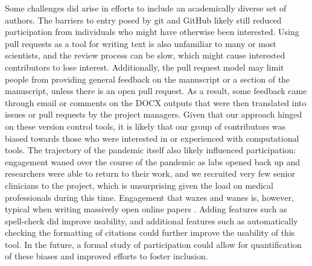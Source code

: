 \documentclass[twocolumn]{ceurart}
\begin{document}
Some challenges did arise in efforts to include an academically diverse set of authors.
The barriers to entry posed by git and GitHub likely still reduced participation from individuals who might have otherwise been interested.
Using pull requests as a tool for writing text is also unfamiliar to many or most scientists, and the review process can be slow, which might cause interested contributors to lose interest.
Additionally, the pull request model may limit people from providing general feedback on the manuscript or a section of the manuscript, unless there is an open pull request.
As a result, some feedback came through email or comments on the DOCX outputs that were then translated into issues or pull requests by the project managers.
Given that our approach hinged on these version control tools, it is likely that our group of contributors was biased towards those who were interested in or experienced with computational tools.
The trajectory of the pandemic itself also likely influenced participation: engagement waned over the course of the pandemic as labs opened back up and researchers were able to return to their work, and we recruited very few senior clinicians to the project, which is unsurprising given the load on medical professionals during this time.
Engagement that waxes and wanes is, however, typical when writing massively open online papers \citep{PoDz2q0A}.
Adding features such as spell-check did improve usability, and additional features such as automatically checking the formatting of citations could further improve the usability of this tool.
In the future, a formal study of participation could allow for quantification of these biases and improved efforts to foster inclusion.
\end{document}
